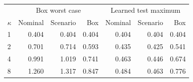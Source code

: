\begin{tabular}{lrrrrrr}\toprule
&\multicolumn{3}{c}{Box worst case}&\multicolumn{3}{c}{Learned test maximum}\\
$\kappa$ & Nominal & Scenario & Box & Nominal & Scenario & Box\\\midrule
1 & 0.404 & 0.404 & 0.404 & 0.404 & 0.404 & 0.404\\
2 & 0.701 & 0.714 & 0.593 & 0.435 & 0.425 & 0.541\\
4 & 0.991 & 1.019 & 0.741 & 0.463 & 0.446 & 0.674\\
8 & 1.260 & 1.317 & 0.847 & 0.484 & 0.463 & 0.776\\
\bottomrule\end{tabular}

